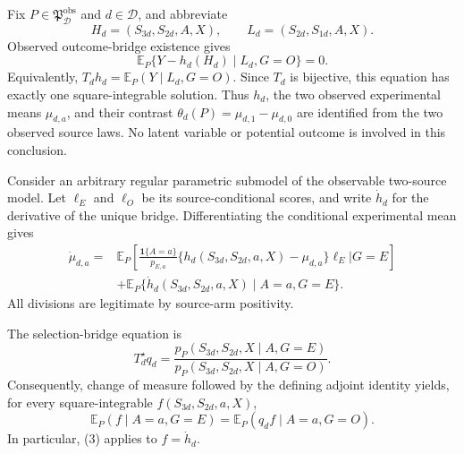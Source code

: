 Fix \(P\in\mathfrak P_{\mathcal D}^{\mathrm{obs}}\) and \(d\in\mathcal D\), and abbreviate
\[
 H_d=(S_{3d},S_{2d},A,X),
 \qquad
 L_d=(S_{2d},S_{1d},A,X).
\]
Observed outcome-bridge existence gives
\[
 \mathbb E_P\{Y-h_d(H_d)\mid L_d,G=O\}=0.                 \tag{1}
\]
Equivalently, \(T_dh_d=\mathbb E_P(Y\mid L_d,G=O)\).  Since \(T_d\) is bijective, this equation has exactly one square-integrable solution.  Thus \(h_d\), the two observed experimental means \(\mu_{d,a}\), and their contrast \(\theta_d(P)=\mu_{d,1}-\mu_{d,0}\) are identified from the two observed source laws.  No latent variable or potential outcome is involved in this conclusion.

Consider an arbitrary regular parametric submodel of the observable two-source model.  Let \(\ell_E\) and \(\ell_O\) be its source-conditional scores, and write \(\dot h_d\) for the derivative of the unique bridge.  Differentiating the conditional experimental mean gives
\[
\begin{aligned}
 \dot\mu_{d,a}
 ={}&\mathbb E_P\!\left[
   \frac{\mathbf 1\{A=a\}}{p_{E,a}}
   \{h_d(S_{3d},S_{2d},a,X)-\mu_{d,a}\}\ell_E
   \mathrel{\Big|}G=E\right]\\
 &+\mathbb E_P\{\dot h_d(S_{3d},S_{2d},a,X)\mid A=a,G=E\}.
                                                               \tag{2}
\end{aligned}
\]
All divisions are legitimate by source-arm positivity.

The selection-bridge equation is
\[
 T_d^\star q_d
 =\frac{p_P(S_{3d},S_{2d},X\mid A,G=E)}
 {p_P(S_{3d},S_{2d},X\mid A,G=O)}.
\]
Consequently, change of measure followed by the defining adjoint identity yields, for every square-integrable \(f(S_{3d},S_{2d},a,X)\),
\[
 \mathbb E_P(f\mid A=a,G=E)
 =\mathbb E_P(q_df\mid A=a,G=O).                       \tag{3}
\]
In particular, (3) applies to \(f=\dot h_d\).

